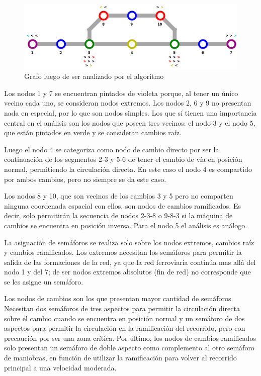 	\begin{figure}[h]
	\centering
		\includegraphics[scale=.4]{./Figures/Mapa_2}
		\caption{Grafo luego de ser analizado por el algoritmo}
		\label{fig:Mapa}
	\end{figure}

	Los nodos 1 y 7 se encuentran pintados de violeta porque, al tener un único vecino cada uno, se consideran nodos extremos. Los nodos 2, 6 y 9 no presentan nada en especial, por lo que son nodos simples. Los que sí tienen una importancia central en el análisis son los nodos que poseen tres vecinos: el nodo 3 y el nodo 5, que están pintados en verde y se consideran cambios raíz.

	Luego el nodo 4 se categoriza como nodo de cambio directo por ser la continuación de los segmentos 2-3 y 5-6 de tener el cambio de vía en posición normal, permitiendo la circulación directa. En este caso el nodo 4 es compartido por ambos cambios, pero no siempre se da este caso.
	
	Los nodos 8 y 10, que son vecinos de los cambios 3 y 5 pero no comparten ninguna coordenada espacial con ellos, son nodos de cambios ramificados. Es decir, solo permitirán la secuencia de nodos 2-3-8 o 9-8-3 si la máquina de cambios se encuentra en posición inversa. Para el nodo 5 el análisis es análogo.

	La asignación de semáforos se realiza solo sobre los nodos extremos, cambios raíz y cambios ramificados. Los extremos necesitan los semáforos para permitir la salida de las formaciones de la red, ya que la red ferroviaria continúa mas allá del nodo 1 y del 7; de ser nodos extremos absolutos (fin de red) no corresponde que se les asigne un semáforo.
	
	Los nodos de cambios son los que presentan mayor cantidad de semáforos. Necesitan dos semáforos de tres aspectos para permitir la circulación directa sobre el cambio cuando se encuentra en posición normal y un semáforo de dos aspectos para permitir la circulación en la ramificación del recorrido, pero con precaución por ser una zona crítica. Por último, los nodos de cambios ramificados solo presentan un semáforo de doble aspecto como complemento al otro semáforo de maniobras, en función de utilizar la ramificación para volver al recorrido principal a una velocidad moderada. 

